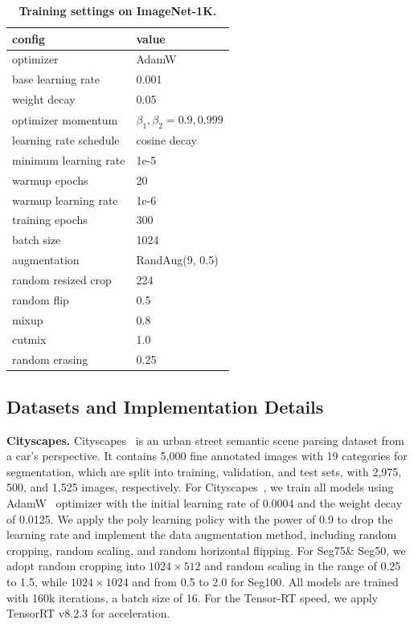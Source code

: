 \documentclass[letterpaper]{article} %
\begin{document}
\begin{table}[!h]
\begin{center}
\caption{\textbf{Training settings on ImageNet-1K.}}
\begin{tabular}{l|l}
\toprule
config & value \\
\hline
optimizer & AdamW \\
base learning rate & 0.001\\
weight decay & 0.05\\
optimizer momentum & $\beta_1, \beta_2{=}0.9, 0.999$ \\
learning rate schedule & cosine decay \\
minimum learning rate & 1e-5 \\
warmup epochs & 20 \\
warmup learning rate & 1e-6 \\
training epochs & 300  \\
batch size & 1024 \\
augmentation & RandAug(9, 0.5) \\
random resized crop & 224 \\
random flip & 0.5\\
mixup & 0.8 \\
cutmix & 1.0 \\
random erasing & 0.25 \\

\bottomrule
\end{tabular}
\label{supp-tab:settings}
\end{center}
\end{table}

\subsection{Datasets and Implementation Details}
{\bf Cityscapes.} Cityscapes~\cite{cordts2016cityscapes} is an urban street semantic scene parsing dataset from a car's perspective. It contains 5,000 fine annotated images with 19 categories for segmentation, which are split into training, validation, and test sets, with 2,975, 500, and 1,525 images, respectively. For Cityscapes~\cite{cordts2016cityscapes}, we train all models using AdamW~\cite{loshchilov2017decoupled} optimizer with the initial learning rate of 0.0004 and the weight decay of 0.0125. We apply the poly learning policy with the power of 0.9 to drop the learning rate and implement the data augmentation method, including random cropping, random scaling, and random horizontal flipping. For Seg75\& Seg50, we adopt random cropping into $1024 \times 512$ and random scaling in the range of 0.25 to 1.5, while $1024 \times 1024$ and from 0.5 to 2.0 for Seg100. All models are trained with 160k iterations, a batch size of 16. For the Tensor-RT speed, we apply TensorRT v8.2.3 for acceleration.
\end{document}
